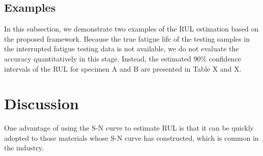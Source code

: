 \subsection{Examples}
In this subsection, we demonstrate two examples of the RUL estimation based on the proposed framework. Because the true fatigue life of the testing samples in the interrupted fatigue testing data is not available, we do not evaluate the accuracy quantitatively in this stage. Instead, the estimated 90\% confidence intervals of the RUL for specimen A and B are presented in Table X and X.

\section{Discussion}
One advantage of using the S-N curve to estimate RUL is that it can be quickly adopted to those materials whose S-N curve has constructed, which is common in the industry.